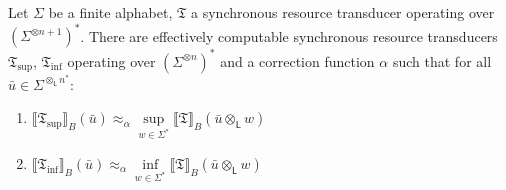 \documentclass{LMCS}
\newcommand{\automatonT}{\mathfrak T}
\newcommand{\semantics}[1]{\llbracket#1\rrbracket}
\newcommand{\costEquiv}[1][\alpha]{\approx_{#1}}
\newcommand{\padprodL}{\otimes_{\mathsf{L}}}
\newcommand{\alphVectorS}[2]{\left(#1^{\otimes #2}\right)^*}
\newcommand{\alphVectorL}[2]{#1^{{\padprodL #2}^*}}
\begin{document}
\begin{lem}\label{lem:InfAndSupLikeFORRAreComutable}
	Let $\Sigma$ be a finite alphabet, $\automatonT$ a synchronous resource
transducer operating over $\alphVectorS{\Sigma}{n+1}$. There are effectively 
computable synchronous resource transducers $\automatonT_{\sup}$, 
$\automatonT_{\inf}$ operating over $\alphVectorS{\Sigma}{n}$ and a correction
function $\alpha$ such that for all $\bar u \in \alphVectorL{\Sigma}{n}$:
\begin{enumerate}[label=(\roman*)]
	 \item $\semantics{\automatonT_{\sup}}_B(\bar u) \costEquiv
   \sup\limits_{w \in \Sigma^*} \semantics{\automatonT}_B(\bar u \padprodL w)$
	\item $\semantics{\automatonT_{\inf}}_B(\bar u) \costEquiv \inf\limits_{w
     \in \Sigma^*} \semantics{\automatonT}_B(\bar u \padprodL w)$
\end{enumerate}
\end{lem}
\end{document}
